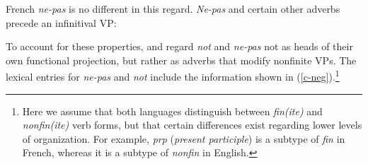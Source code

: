 \documentclass[output=paper
                ,modfonts
                		,nonflat
	        ,collection
	        ,collectionchapter
	        ,collectiontoclongg
 	        ,biblatex
                ,babelshorthands
                ,newtxmath
                ,draftmode
                ,colorlinks, citecolor=brown
]{./langsci/langscibook}
\begin{document}
{\begin{exe}
\begin{xlist}
\begin{exe}
\begin{xlist}
\eal\label{31}
\zl

\noindent
French \textit{ne-pas} is no different in this regard.  \textit{Ne-pas} and
certain other adverbs precede an infinitival VP:

\eal
{}
\zl

To account for these properties, \citet{Kim:00} and \citet{KS:02} regard \textit{not} and \textit{ne-pas} not as heads of their own functional projection, but rather as adverbs that modify
nonfinite VPs. The lexical entries for \textit{ne-pas} and \textit{not} include the
information shown in (\ref{c-neg}).\footnote{Here we assume that both languages
distinguish between \textit{fin(ite)} and \textit{nonfin(ite)} verb forms, but that
certain differences exist regarding lower levels of organization. For example,
\textit{prp} (\textit{present participle}) is a subtype of \textit{fin} in French,
whereas it is a subtype of \textit{nonfin} in English.}

%


\end{xlist}
\end{exe}
\end{xlist}
\end{exe}}
\end{document}
